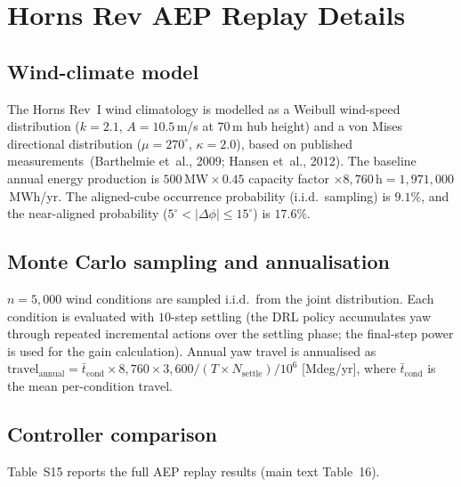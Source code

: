 \documentclass{article}
\begin{document}
\section{Horns Rev AEP Replay Details}\label{sec:aep_details}

\subsection{Wind-climate model}

The Horns Rev~I wind climatology is modelled as a Weibull wind-speed distribution ($k{=}2.1$, $A{=}10.5$\,m/s at $70$\,m hub height) and a von Mises directional distribution ($\mu{=}270^\circ$, $\kappa{=}2.0$), based on published measurements~(Barthelmie et~al., 2009; Hansen et~al., 2012). The baseline annual energy production is $500\,\mathrm{MW} \times 0.45$ capacity factor $\times 8{,}760\,\mathrm{h} = 1{,}971{,}000$\,MWh/yr. The aligned-cube occurrence probability (i.i.d.\ sampling) is $9.1\%$, and the near-aligned probability ($5^\circ{<}|\Delta\phi|{\le}15^\circ$) is $17.6\%$.

\subsection{Monte Carlo sampling and annualisation}

$n{=}5{,}000$ wind conditions are sampled i.i.d.\ from the joint distribution. Each condition is evaluated with $10$-step settling (the DRL policy accumulates yaw through repeated incremental actions over the settling phase; the final-step power is used for the gain calculation). Annual yaw travel is annualised as $\mathrm{travel}_\mathrm{annual} = \bar{t}_\mathrm{cond} \times 8{,}760 \times 3{,}600 / (T \times N_\mathrm{settle}) / 10^6$ [Mdeg/yr], where $\bar{t}_\mathrm{cond}$ is the mean per-condition travel.

\subsection{Controller comparison}

Table~S15 reports the full AEP replay results (main text Table~16).
\end{document}
